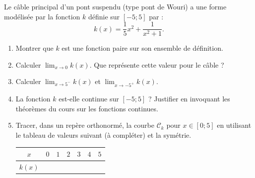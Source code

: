 \documentclass[11pt]{article}
\begin{document}
\begin{exercice}
Le câble principal d'un pont suspendu (type pont de Wouri) a une forme modélisée par la fonction $k$ définie sur $[-5 ; 5]$ par :
\[ k(x) = \frac{1}{5}x^2 + \frac{1}{x^2 + 1}. \]
\begin{enumerate}
    \item Montrer que $k$ est une fonction paire sur son ensemble de définition.
    \item Calculer $\lim_{x \to 0} k(x)$. Que représente cette valeur pour le câble ?
    \item Calculer $\lim_{x \to 5^-} k(x)$ et $\lim_{x \to -5^+} k(x)$.
    \item La fonction $k$ est-elle continue sur $[-5 ; 5]$ ? Justifier en invoquant les théorèmes du cours sur les fonctions continues.
    \item Tracer, dans un repère orthonormé, la courbe $\mathcal{C}_k$ pour $x \in [0 ; 5]$ en utilisant le tableau de valeurs suivant (à compléter) et la symétrie.
    \begin{center}
    \begin{tabular}{|c|c|c|c|c|c|c|}
    \hline
    $x$ & $0$ & $1$ & $2$ & $3$ & $4$ & $5$ \\
    \hline
    $k(x)$ &  &  &  &  &  & \\
    \hline
    \end{tabular}
    \end{center}
\end{enumerate}
\end{exercice}
\end{document}
